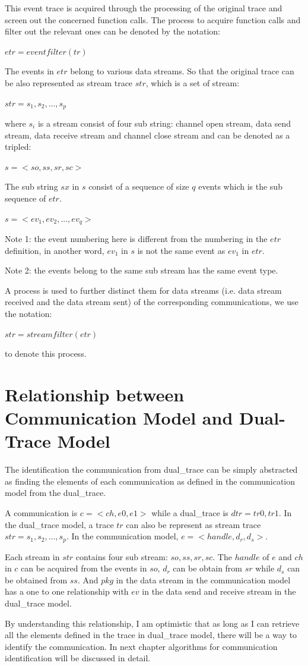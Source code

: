 This event trace is acquired through the processing of the original trace and screen out the concerned function calls. The process to acquire function calls and filter out the relevant ones can be denoted by the notation: 

$etr = eventfilter(tr)$

The events in $etr$ belong to various data streams. So that the original trace can be also represented as stream trace $str$, which is a set of stream:

$str = {s_1, s_2, ..., s_p}$

where $s_i$ is a stream consist of four sub string: channel open stream, data send stream, data receive stream and channel close stream and can be denoted as a tripled:

$s = <so,ss,sr,sc>$

The sub string $sx$ in $s$ consist of a sequence of size $q$ events which is the sub sequence of $etr$. 

$s = <ev_1, ev_2,..., ev_q>$

Note 1:  the event numbering here is different from the numbering in the $etr$ definition, in another word, $ev_1$ in $s$ is not the same event as $ev_1$ in $etr$. 

Note 2: the events belong to the same sub stream has the same event type. 

A process is used to further distinct them for data streams (i.e. data stream received and the data stream sent) of the corresponding communications, we use the notation:

$str = streamfilter(etr)$

to denote this process.


\section{Relationship between Communication Model and Dual-Trace Model}
The identification the communication from dual\_trace can be simply abstracted as finding the elements of each communication as defined in the communication model from the dual\_trace. 

A communication is $c =<ch, e0, e1>$ while a dual\_trace is $dtr = {tr0, tr1}$. In the dual\_trace model, a trace $tr$ can also be represent as stream trace $str = {s_1, s_2, ..., s_p}$. In the communication model, $ e =<handle, d_r, d_s>$. 

Each stream in $str$ contains four sub stream: $so, ss, sr, sc$.  The $handle$ of $e$ and $ch$ in $c$ can be acquired from the events in $so$, $d_r$ can be obtain from $sr$ while $d_s$ can be obtained from $ss$. And $pkg$ in the data stream in the communication model has a one to one relationship with $ev$ in the data send and receive stream in the dual\_trace model.

By understanding this relationship, I am optimistic that as long as I can retrieve all the elements defined in the trace in dual\_trace model, there will be a way to identify the communication. In next chapter algorithms for communication identification will be discussed in detail. 

